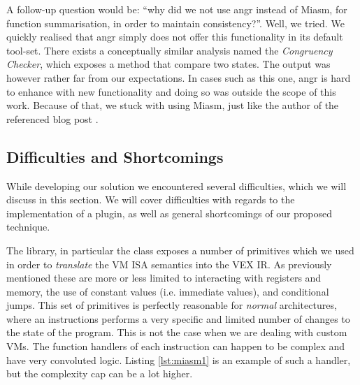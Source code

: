 A follow-up question would be: ``why did we not use angr instead of Miasm, for function summarisation, in order to maintain consistency?''. Well, we tried. We quickly realised that angr simply does not offer this functionality in its default tool-set. There exists a conceptually similar analysis named the \emph{Congruency Checker}, which exposes a method that compare two states. The output was however rather far from our expectations. In cases such as this one, angr is hard to enhance with new functionality and doing so was outside the scope of this work. Because of that, we stuck with using Miasm, just like the author of the referenced blog post \cite{zeusvm_miasm}.

\subsection{Difficulties and Shortcomings}
\label{sec:shortcomings}

While developing our solution we encountered several difficulties, which we will discuss in this section. We will cover difficulties with regards to the implementation of a plugin, as well as general shortcomings of our proposed technique.

The  library, in particular the  class exposes a number of primitives which we used in order to \emph{translate} the \gls{VM} \gls{ISA} semantics into the VEX \gls{IR}. As previously mentioned these are more or less limited to interacting with registers and memory, the use of constant values (i.e. immediate values), and conditional jumps. This set of primitives is perfectly reasonable for \emph{normal} architectures, where an instructions performs a very specific and limited number of changes to the state of the program. This is not the case when we are dealing with custom \glspl{VM}. The function handlers of each instruction can happen to be complex and have very convoluted logic. Listing \ref{lst:miasm1} is an example of such a handler, but the complexity cap can be a lot higher.

